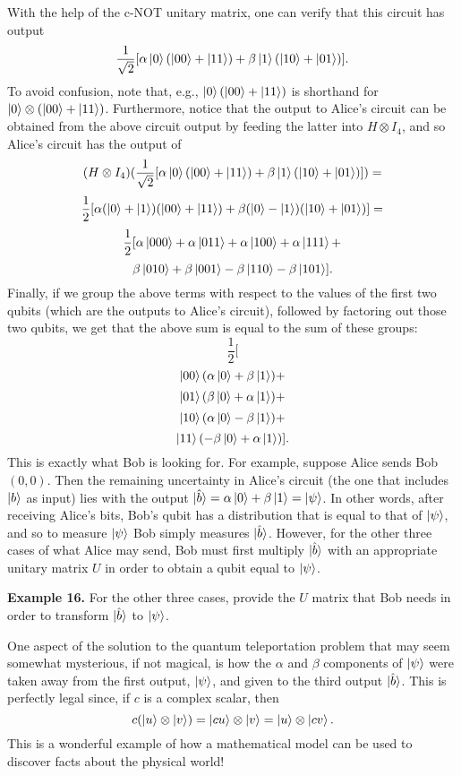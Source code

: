 \documentclass [12pt]{article}
\theoremstyle{definition}
\begin{document}
With the help of the c-NOT unitary matrix, one can verify that this circuit has output
\[\frac{1}{\sqrt{2}}[\alpha\ket{0}(\ket{00} + \ket{11}) + \beta\ket{1}(\ket{10}+\ket{01})].\]
To avoid confusion, note that, e.g., $\ket{0}(\ket{00} + \ket{11})$ is shorthand for $\ket{0}\otimes (\ket{00} + \ket{11})$.
Furthermore, notice that the output to Alice's circuit can be obtained from the above circuit output by feeding the latter into 
$H\otimes I_4$, and so Alice's circuit has the output of 
\[(H\otimes I_4)(\frac{1}{\sqrt{2}}[\alpha\ket{0}(\ket{00} + \ket{11}) + \beta\ket{1}(\ket{10}+\ket{01})]) = \]
\[\frac{1}{2}[\alpha (\ket{0} +\ket{1}) (\ket{00} + \ket{11}) + \beta (\ket{0}-\ket{1}) (\ket{10} + \ket{01})] = \]
\[\frac{1}{2}[\alpha\ket{000}+\alpha\ket{011} + \alpha\ket{100}+\alpha\ket{111} +\]
\[\beta\ket{010} + \beta\ket{001} - \beta\ket{110} - \beta\ket{101}].\]
Finally, if we group the above terms with respect to the values of the first two qubits (which are the outputs to Alice's circuit), followed by factoring out those two 
qubits, we get that the above sum is equal to the sum of these groups:
\[\frac{1}{2}[\]
\[\ket{00}(\alpha\ket{0} + \beta\ket{1}) + \]
\[\ket{01}(\beta\ket{0} + \alpha\ket{1}) + \]
\[\ket{10}(\alpha\ket{0} - \beta\ket{1}) + \]
\[\ket{11}(-\beta\ket{0} + \alpha\ket{1})].\]
This is exactly what Bob is looking for. For example, suppose Alice sends Bob $(0,0)$. Then the remaining uncertainty in Alice's circuit (the one that includes $\ket{b}$ as input)
lies with the output $\ket{\hat{b}}=\alpha\ket{0} + \beta\ket{1} = \ket{\psi}$. In other words, after receiving Alice's bits, Bob's qubit has a distribution that is equal to that
of $\ket{\psi}$, and so to measure $\ket{\psi}$ Bob simply measures $\ket{\hat{b}}$. However, for the other three cases of what Alice may send, Bob must first multiply 
$\ket{\hat{b}}$ with an appropriate unitary matrix $U$ in order to obtain a qubit equal to $\ket{\psi}$.

\newpage
\textbf{Example 16.} For the other three cases, provide the $U$ matrix that Bob needs in order to transform $\ket{\hat{b}}$ to $\ket{\psi}$.






\newpage
One aspect of the solution to the quantum teleportation problem that may seem somewhat mysterious, if not magical, is how the $\alpha$ and $\beta$ components of $\ket{\psi}$ 
were taken away from the first output, $\ket{\psi}$, and given to the third output $\ket{\hat{b}}$. This is perfectly legal since, if $c$ is a complex scalar, then
\[c(\ket{u}\otimes\ket{v}) = \ket{cu}\otimes\ket{v} = \ket{u}\otimes\ket{cv}.\]
This is a wonderful example of how a mathematical model can be used to discover facts about the physical world!
\end{document}
